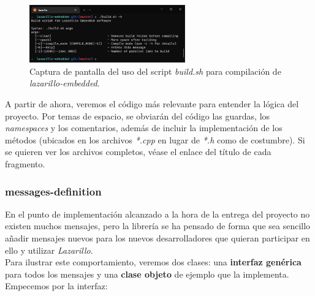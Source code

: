 \begin{figure}[h]
	\centering
	\includegraphics[width=0.6\textwidth]{imagenes/lazarillo-build-sh.png}
	\caption{Captura de pantalla del uso del script \emph{build.sh} para compilación de \textit{lazarillo-embedded}.}
	\label{lazarillo-build-sh}
\end{figure}

A partir de ahora, veremos el código más relevante para entender la lógica del proyecto. Por temas de espacio, se obviarán del código las guardas, los \textit{namespaces} y los comentarios, además de incluir la implementación de los métodos (ubicados en los archivos \emph{*.cpp} en lugar de \emph{*.h} como de costumbre). Si se quieren ver los archivos completos, véase el enlace del título de cada fragmento.\\

\subsubsection{messages-definition}

En el punto de implementación alcanzado a la hora de la entrega del proyecto no existen muchos mensajes, pero la librería se ha pensado de forma que sea sencillo añadir mensajes nuevos para los nuevos desarrolladores que quieran participar en ello y utilizar \textit{Lazarillo}.\\

Para ilustrar este comportamiento, veremos dos clases: una \textbf{interfaz genérica} para todos los mensajes y una \textbf{clase objeto} de ejemplo que la implementa. Empecemos por la interfaz:\\

